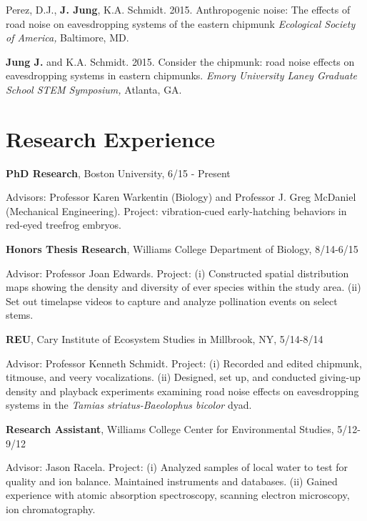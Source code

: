\documentclass[margin,line]{res}
\begin{document}
\begin{resume}
\vspace{-.25cm}
Perez, D.J., {\bf J. Jung}, K.A. Schmidt. {2015.} {Anthropogenic noise: The effects of road noise on eavesdropping systems of the eastern chipmunk} {\it Ecological Society of America,} {Baltimore, MD.}

\vspace{-.25cm}
{\bf Jung J.} and K.A. Schmidt. {2015.} {Consider the chipmunk: road noise effects on eavesdropping systems in eastern chipmunks.} {\it Emory University Laney Graduate School STEM Symposium,} {Atlanta, GA. }

\section{\sc Research Experience}
{\bf PhD Research},  Boston University, 6/15 - Present 

\vspace{-.43cm}
{Advisors: Professor Karen Warkentin (Biology) and Professor J. Greg McDaniel (Mechanical Engineering). Project: vibration-cued early-hatching behaviors in red-eyed treefrog embryos. }

\vspace{-.1cm}
{\bf Honors Thesis Research},  Williams College Department of Biology, 8/14-6/15 

\vspace{-.43cm}
{Advisor: Professor Joan Edwards. Project: (i) Constructed spatial distribution maps showing the density and diversity of ever species within the study area. (ii) Set out timelapse videos to capture and analyze pollination events on select stems.} 

\vspace{-.1cm}
{\bf REU},  Cary Institute of Ecosystem Studies in Millbrook, NY, 5/14-8/14

\vspace{-.43cm}
{Advisor: Professor Kenneth Schmidt. Project: (i) Recorded and edited chipmunk, titmouse, and veery vocalizations. (ii) Designed, set up, and conducted giving-up density and playback experiments examining road noise effects on eavesdropping systems in the {\it Tamias striatus-Baeolophus bicolor} dyad.}

\vspace{-.1cm}
{\bf Research Assistant},  Williams College Center for Environmental Studies, 5/12-9/12

\vspace{-.43cm}
{Advisor: Jason Racela. Project: (i) Analyzed samples of local water to test for quality and ion balance. Maintained instruments and databases. (ii) Gained experience with atomic absorption spectroscopy, scanning electron microscopy, ion chromatography.}


\end{resume}
\end{document}
